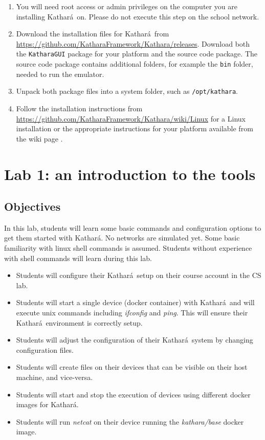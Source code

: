 \documentclass[12pt]{book}
\newcommand{\kathara}{Kathar\'a}
\begin{document}
\begin{enumerate}[(1)]
\item You will need root access or admin privileges on
  the computer you are installing \kathara\ on. Please do not execute
  this step on the school network.

\item Download the installation files for \kathara\ from
  \url{https://github.com/KatharaFramework/Kathara/releases}. 
Download both the \verb$KatharaGUI$ package for your platform and the
source code package. The source code package contains additional
folders, for example the \verb$bin$ folder, needed to run the
emulator. 

\item Unpack both package files into a system folder, such as
\verb$/opt/kathara$. 

\item Follow the installation instructions from
\url{https://github.com/KatharaFramework/Kathara/wiki/Linux} for a
Linux installation or the appropriate instructions for your platform
available from the wiki page \cite{kathara-wiki}. 

\end{enumerate}




\chapter{Lab 1: an introduction to the tools}

\section{Objectives}

In this lab, students will learn some basic commands and configuration options to get them started with \kathara. No networks are simulated yet. Some basic familiarity with linux shell commands is assumed. Students without experience with shell commands will learn during this lab.

\begin{itemize}[--]
  \item Students will configure their \kathara\ setup on their course account in the CS lab. 
  \item Students will start a single device (docker container) with \kathara\ and will execute unix commands including \emph{ifconfig} and \emph{ping}. This will ensure their \kathara\ environment is correctly setup.
  \item Students will adjust the configuration of their \kathara\ system by changing configuration files.
  \item Students will create files on their devices that can be visible on their host machine, and vice-versa.
  \item Students will start and stop the execution of devices using different docker images for \kathara.
    \item Students will run \emph{netcat} on their device running the \emph{kathara/base} docker image.
\end{itemize}
\end{document}
